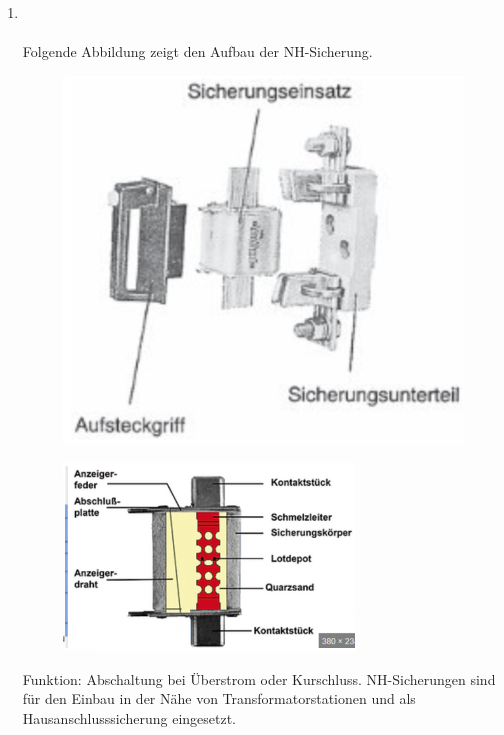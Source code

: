 \begin{enumerate}
    \item   {}\\\\
            Folgende Abbildung zeigt den Aufbau der NH-Sicherung.
            \begin{figure}[!htp]
                \centering
                \includegraphics[scale = 0.3]{img/NH_Aufbau.png}
            \end{figure}
            \begin{figure}[!htp]
                \centering
                \includegraphics[scale = 0.3]{img/NH_Aufbau_real.PNG}
            \end{figure}

            Funktion: Abschaltung bei Überstrom oder Kurschluss. NH-Sicherungen sind für den Einbau in der Nähe von Transformatorstationen 
            und als Hausanschlusssicherung eingesetzt.


\end{enumerate}
